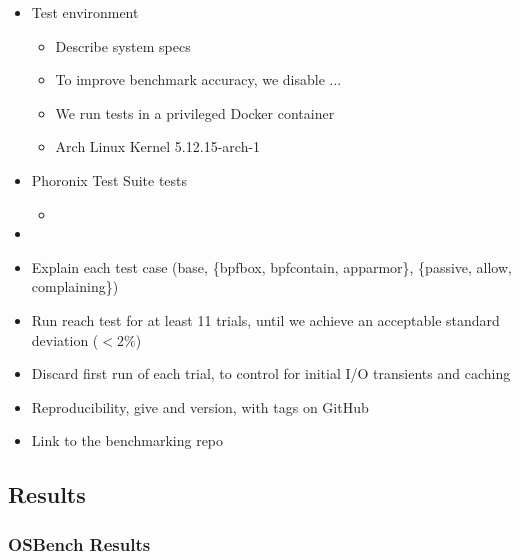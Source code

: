 \begin{inprogress}
  \begin{itemize}
    \item Test environment
    \begin{itemize}
      \item Describe system specs
      \item To improve benchmark accuracy, we disable ...
      \item We run tests in a privileged Docker container
      \item Arch Linux Kernel 5.12.15-arch-1
    \end{itemize}

    \item Phoronix Test Suite tests
    \begin{itemize}
      \item {}
    \end{itemize}

    \item {}

    \item Explain each test case (base, \{bpfbox, bpfcontain, apparmor\}, \{passive, allow, complaining\})
    \item Run reach test for at least 11 trials, until we achieve an acceptable standard deviation ($<2\%$)
    \item Discard first run of each trial, to control for initial I/O transients and caching
    \item Reproducibility, give \bpfbox{} and \bpfcontain{} version, with tags on GitHub
    \item Link to the benchmarking repo

  \end{itemize}
\end{inprogress}

\subsection{Results}%
\label{ss:eval-results}


\subsubsection{OSBench Results}

